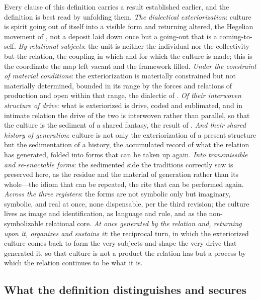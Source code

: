 \noindent
Every clause of this definition carries a result established earlier, and the definition is best read by unfolding them. \emph{The dialectical exteriorization}: culture is spirit going out of itself into a visible form and returning altered, the Hegelian movement of , not a deposit laid down once but a going-out that is a coming-to-self. \emph{By relational subjects}: the unit is neither the individual nor the collectivity but the relation, the coupling in which and for which the culture is made; this is the coordinate the map left vacant and the framework filled. \emph{Under the constraint of material conditions}: the exteriorization is materially constrained but not materially determined, bounded in its range by the forces and relations of production and open within that range, the dialectic of . \emph{Of their interwoven structure of drive}: what is exteriorized is drive, coded and sublimated, and in intimate relation the drive of the two is interwoven rather than parallel, so that the culture is the sediment of a shared fantasy, the result of . \emph{And their shared history of generation}: culture is not only the exteriorization of a present structure but the sedimentation of a history, the accumulated record of what the relation has generated, folded into forms that can be taken up again. \emph{Into transmissible and re-enactable forms}: the sedimented side the traditions correctly saw is preserved here, as the residue and the material of generation rather than its whole---the idiom that can be repeated, the rite that can be performed again. \emph{Across the three registers}: the forms are not symbolic only but imaginary, symbolic, and real at once, none dispensable, per the third revision; the culture lives as image and identification, as language and rule, and as the non-symbolizable relational core. \emph{At once generated by the relation and, returning upon it, organizes and sustains it}: the reciprocal turn, in which the exteriorized culture comes back to form the very subjects and shape the very drive that generated it, so that culture is not a product the relation has but a process by which the relation continues to be what it is.

\subsection*{What the definition distinguishes and secures}

